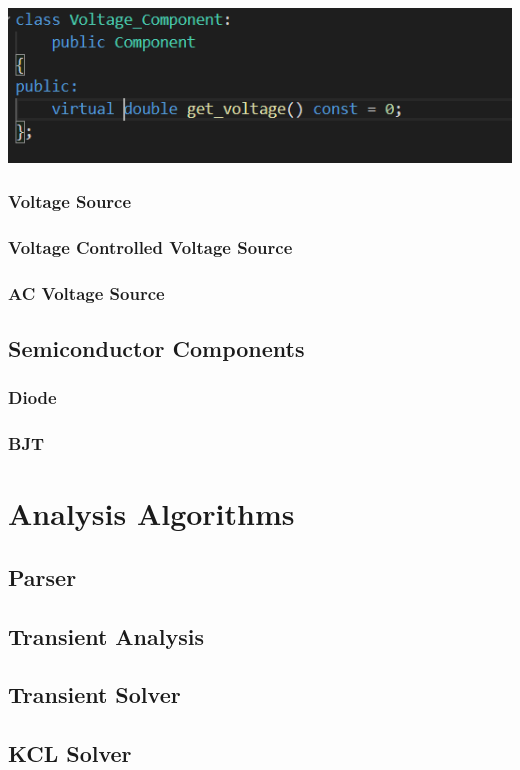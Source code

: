 \documentclass{article}
\begin{document}
\includegraphics[width=15cm]{images/Voltage_Component.PNG}

\subsubsection{Voltage Source}
\subsubsection{Voltage Controlled Voltage Source}
\subsubsection{AC Voltage Source}

\subsection{Semiconductor Components}
\subsubsection{Diode}
\subsubsection{BJT}


\section{Analysis Algorithms}
\subsection{Parser}
\subsection{Transient Analysis}
\subsection{Transient Solver}
\subsection{KCL Solver}
\end{document}
